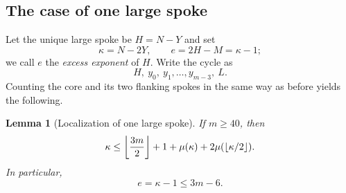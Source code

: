 \documentclass[11pt]{article}
\newtheorem{lemma}[theorem]{Lemma}
\theoremstyle{definition}
\theoremstyle{remark}
\numberwithin{equation}{section}
\DeclarePairedDelimiter{\floor}{\lfloor}{\rfloor}
\begin{document}
\subsection{The case of one large spoke}

Let the unique large spoke be $H=N-Y$ and set
\[
  \kappa=N-2Y,
  \qquad
  e=2H-M=\kappa-1;
\]
we call $e$ the \emph{excess exponent} of $H$. Write the cycle as
\[
  H,\ y_0,\ y_1,\ldots,y_{m-3},\ L.
\]
Counting the core and its two flanking spokes in the same way as before yields the following.

\begin{lemma}[Localization of one large spoke]\label{lem:one-large-position}
If $m\ge40$, then
\begin{equation}\label{eq:one-large-fixedpoint}
  \kappa\le\floor*{\frac{3m}{2}}+1
  +\mu(\kappa)+2\mu(\floor{\kappa/2}).
\end{equation}
In particular,
\begin{equation}\label{eq:e-3m}
  e=\kappa-1\le3m-6.
\end{equation}
\end{lemma}
\end{document}
